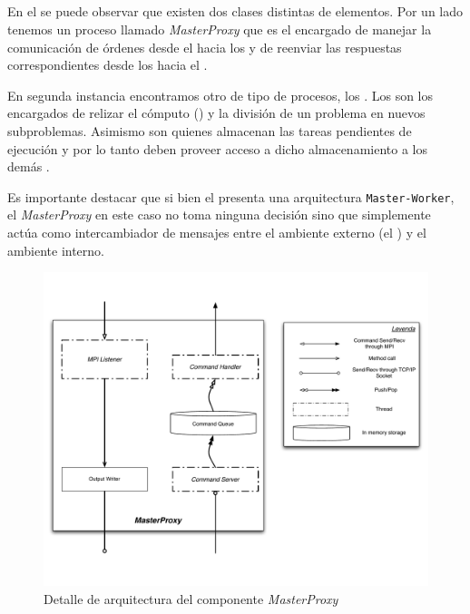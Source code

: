 \subsection{\bend}
\label{sec:backend}
\newcommand{\master}{\emph{MasterProxy}\xspace}

En el \bend se puede observar que existen dos clases distintas de elementos.
Por un lado tenemos un proceso llamado \master que es el encargado de manejar
la comunicación de órdenes desde el \fend hacia los \ws y de reenviar las
respuestas correspondientes desde los \ws hacia el \fend.

En segunda instancia encontramos otro de tipo de procesos, los \ws. Los \ws
son los encargados de relizar el cómputo (\ssolving) y la división de un
problema en nuevos subproblemas. Asimismo son quienes almacenan las tareas
pendientes de ejecución y por lo tanto deben proveer acceso a dicho
almacenamiento a los demás \ws.

\newcommand{\masterslave}{\texttt{Master-Worker}\xspace}

Es importante destacar que si bien el \bend presenta una arquitectura
\masterslave, el \master en este caso no toma ninguna decisión sino que
simplemente actúa como intercambiador de mensajes entre el ambiente externo
(el \fend) y el ambiente interno.

\begin{figure}[h!]
\centering
\includegraphics[scale=0.4]{graphs/master proxy detail}
\caption{Detalle de arquitectura del componente \master}
\label{fig:masterproxydetail}
\end{figure}

